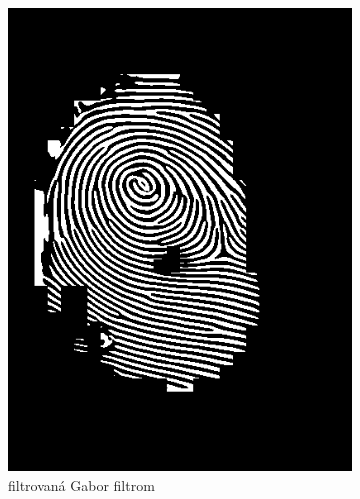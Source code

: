 \begin{figure}[h]
\begin{subfigure}[b]{0.3\linewidth}
      \includegraphics[width=\linewidth]{obrazky-figures/warts_gabor.png}
      \caption{filtrovaná Gabor filtrom}
    \end{subfigure}
    \hfill
    \begin{subfigure}[b]{0.3\linewidth}

\end{subfigure}
\end{figure}
